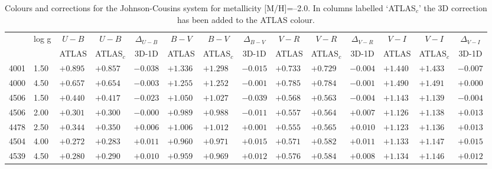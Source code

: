 \documentclass[]{aa}
\def\teff{$T\rm_{eff}$}
\begin{document}
\begin{appendix}
\begin{table*}
\caption{\label{ubvrim20}
Colours and corrections for the Johnson-Cousins system for metallicity [M/H]=--2.0. In columns labelled `ATLAS$_c$' the 3D correction
has been added to the ATLAS colour. }
\renewcommand{\tabcolsep}{3pt}
\tabskip=0pt
\begin{center}
\begin{tabular}{llllllllllllll}
\hline\noalign{\smallskip}
\multicolumn{1}{c}{\teff} & 
\multicolumn{1}{c}{log g} & 
\multicolumn{1}{c}{$U-B$} &
\multicolumn{1}{c}{$U-B$} &
\multicolumn{1}{c}{$\Delta_{U-B}$} &
\multicolumn{1}{c}{$B-V$} &
\multicolumn{1}{c}{$B-V$} &
\multicolumn{1}{c}{$\Delta_{B-V}$} &
\multicolumn{1}{c}{$V-R$} &
\multicolumn{1}{c}{$V-R$} &
\multicolumn{1}{c}{$\Delta_{V-R}$} &
\multicolumn{1}{c}{$V-I$} &
\multicolumn{1}{c}{$V-I$} &
\multicolumn{1}{c}{$\Delta_{V-I}$} \\
\multicolumn{2}{c}{ } &  
\multicolumn{1}{c}{ATLAS} &
\multicolumn{1}{c}{ATLAS$_c$}&
\multicolumn{1}{c}{3D-1D}&
\multicolumn{1}{c}{ATLAS} &
\multicolumn{1}{c}{ATLAS$_c$}&
\multicolumn{1}{c}{3D-1D}&
\multicolumn{1}{c}{ATLAS} &
\multicolumn{1}{c}{ATLAS$_c$}&
\multicolumn{1}{c}{3D-1D}&
\multicolumn{1}{c}{ATLAS} &
\multicolumn{1}{c}{ATLAS$_c$}&
\multicolumn{1}{c}{3D-1D} \\
\hline\noalign{\smallskip}
\hline\noalign{\smallskip}
4001  &1.50& $ +0.895$&$  +0.857$&$  -0.038$&$  +1.336$&$  +1.298$&$  -0.015$&$  +0.733$&$  +0.729$&$  -0.004$&$  +1.440$&$  +1.433$&$  -0.007$\\
4000  &4.50& $ +0.657$&$  +0.654$&$  -0.003$&$  +1.255$&$  +1.252$&$  -0.001$&$  +0.785$&$  +0.784$&$  -0.001$&$  +1.490$&$  +1.491$&$  +0.000$\\
4506  &1.50& $ +0.440$&$  +0.417$&$  -0.023$&$  +1.050$&$  +1.027$&$  -0.039$&$  +0.568$&$  +0.563$&$  -0.004$&$  +1.143$&$  +1.139$&$  -0.004$\\
4506  &2.00& $ +0.301$&$  +0.300$&$  -0.000$&$  +0.989$&$  +0.988$&$  -0.011$&$  +0.557$&$  +0.564$&$  +0.007$&$  +1.126$&$  +1.138$&$  +0.013$\\
4478  &2.50& $ +0.344$&$  +0.350$&$  +0.006$&$  +1.006$&$  +1.012$&$  +0.001$&$  +0.555$&$  +0.565$&$  +0.010$&$  +1.123$&$  +1.136$&$  +0.013$\\
4504  &4.00& $ +0.272$&$  +0.283$&$  +0.011$&$  +0.960$&$  +0.971$&$  +0.015$&$  +0.571$&$  +0.582$&$  +0.011$&$  +1.133$&$  +1.147$&$  +0.015$\\
4539  &4.50& $ +0.280$&$  +0.290$&$  +0.010$&$  +0.959$&$  +0.969$&$  +0.012$&$  +0.576$&$  +0.584$&$  +0.008$&$  +1.134$&$  +1.146$&$  +0.012$\\

\end{tabular}
\end{center}
\end{table*}
\end{appendix}
\end{document}
